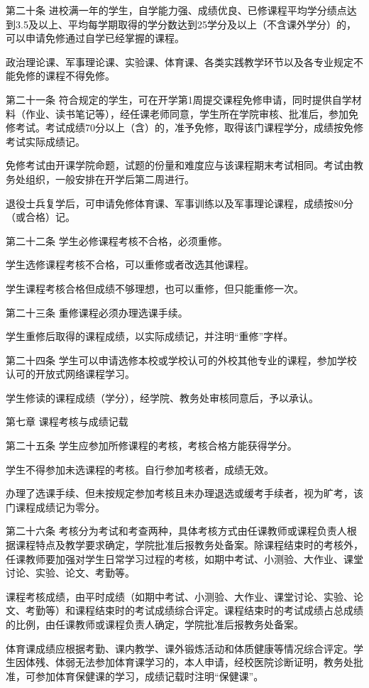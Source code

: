 \documentclass[UTF8,12pt,a4paper]{report}
\begin{document}
第二十条  进校满一年的学生，自学能力强、成绩优良、已修课程平均学分绩点达到3.5及以上、平均每学期取得的学分数达到25学分及以上（不含课外学分）的，可以申请免修通过自学已经掌握的课程。

政治理论课、军事理论课、实验课、体育课、各类实践教学环节以及各专业规定不能免修的课程不得免修。

第二十一条  符合规定的学生，可在开学第1周提交课程免修申请，同时提供自学材料（作业、读书笔记等），经任课老师同意，学生所在学院审核、批准后，参加免修考试。考试成绩70分以上（含）的，准予免修，取得该门课程学分，成绩按免修考试实际成绩记。

免修考试由开课学院命题，试题的份量和难度应与该课程期末考试相同。考试由教务处组织，一般安排在开学后第二周进行。

退役士兵复学后，可申请免修体育课、军事训练以及军事理论课程，成绩按80分（或合格）记。

第二十二条  学生必修课程考核不合格，必须重修。

学生选修课程考核不合格，可以重修或者改选其他课程。

学生课程考核合格但成绩不够理想，也可以重修，但只能重修一次。

第二十三条  重修课程必须办理选课手续。

学生重修后取得的课程成绩，以实际成绩记，并注明“重修”字样。

第二十四条  学生可以申请选修本校或学校认可的外校其他专业的课程，参加学校认可的开放式网络课程学习。

学生修读的课程成绩（学分），经学院、教务处审核同意后，予以承认。



第七章  课程考核与成绩记载

第二十五条  学生应参加所修课程的考核，考核合格方能获得学分。

学生不得参加未选课程的考核。自行参加考核者，成绩无效。

办理了选课手续、但未按规定参加考核且未办理退选或缓考手续者，视为旷考，该门课程成绩记为零分。

第二十六条  考核分为考试和考查两种，具体考核方式由任课教师或课程负责人根据课程特点及教学要求确定，学院批准后报教务处备案。除课程结束时的考核外，任课教师要加强对学生日常学习过程的考核，如期中考试、小测验、大作业、课堂讨论、实验、论文、考勤等。

课程考核成绩，由平时成绩（如期中考试、小测验、大作业、课堂讨论、实验、论文、考勤等）和课程结束时的考试成绩综合评定。课程结束时的考试成绩占总成绩的比例，由任课教师或课程负责人确定，学院批准后报教务处备案。

体育课成绩应根据考勤、课内教学、课外锻炼活动和体质健康等情况综合评定。学生因体残、体弱无法参加体育课学习的，本人申请，经校医院诊断证明，教务处批准，可参加体育保健课的学习，成绩记载时注明“保健课”。
\end{document}
